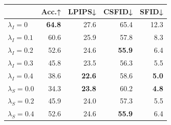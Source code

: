 \begin{table}
\small
\center
\begin{tabular}{lrrrr}
\toprule
 & \textbf{Acc.↑} & \textbf{LPIPS↓} & \textbf{CSFID↓} & \textbf{SFID↓} \\
\midrule
                   $\lambda_I=0$ & \textbf{64.8} &   27.6 &   65.4 & 12.3 \\
                   $\lambda_I=0.1$ & 60.6 &   25.9 &   57.8 &  8.3 \\
                     
                    \rowcolor{LightGrey} $\lambda_I=0.2$   & 52.6 &   24.6 &   \textbf{55.9} &  6.4 \\
                   $\lambda_I=0.3$ & 45.8 &   23.5 &   56.3 &  5.5 \\
                   $\lambda_I=0.4$ & 38.6 &   \textbf{22.6} &   58.6 &  \textbf{5.0} \\
                   \midrule
                   $\lambda_S=0.0$ & 34.3 &   \textbf{23.8} &   60.2 &  \textbf{4.8} \\
                  $\lambda_S=0.2$ & 45.9 &   24.0 &   57.3 &  5.5 \\
                  \rowcolor{LightGrey} $\lambda_S=0.4$   & 52.6 &   24.6 &   \textbf{55.9} &  6.4 \\
                  

\end{tabular}
\end{table}
